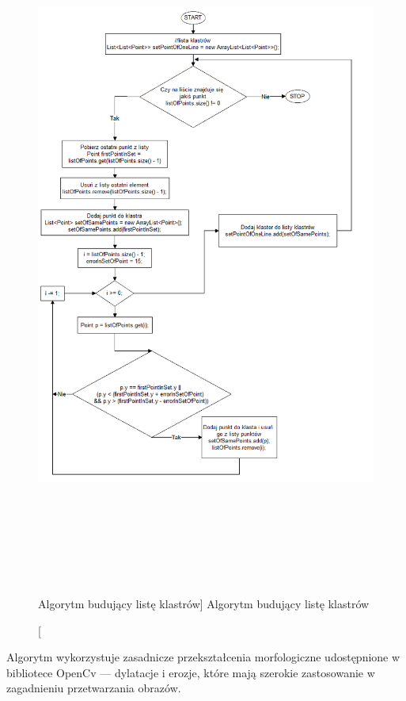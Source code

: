 \documentclass[a4paper,12pt]{article}
\begin{document}
    			\begin{figure}[!ht]  
    		        \begin{center}
    		    	    \includegraphics[height=22.5cm]{image//algorithm//prepareImgToAnalizePred.png} 
    			    \end{center}
        			\caption
        			    [Algorytm budujący listę klastrów]  
            			{Algorytm budujący listę klastrów}  
    		    \end{figure}
		        \newpage
		        Algorytm wykorzystuje zasadnicze przekształcenia morfologiczne udostępnione w bibliotece OpenCv --- dylatacje i erozje, które mają szerokie zastosowanie w zagadnieniu przetwarzania obrazów. \par
\end{document}
